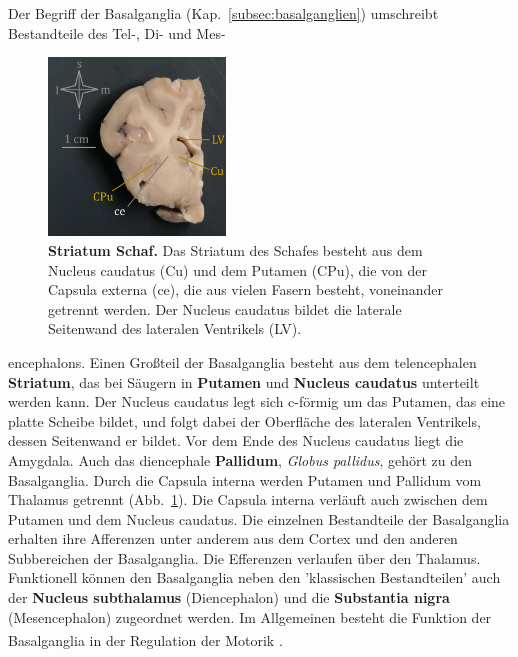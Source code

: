 Der Begriff der Basalganglia (Kap.~\ref{subsec:basalganglien}) umschreibt Bestandteile des Tel-, Di- und Mes-

\begin{figure}
    \centering
    \includegraphics[width=0.42\textwidth]{pictures/Bilder_Jule/Schaf/Ausschnitte/Striatum.png}
    \caption[Striatum Schaf]{\textbf{Striatum Schaf.} Das Striatum des Schafes besteht aus dem Nucleus caudatus (Cu) und dem Putamen (CPu), die von der Capsula externa (ce), die aus vielen Fasern besteht, voneinander getrennt werden. Der Nucleus caudatus bildet die laterale Seitenwand des lateralen Ventrikels (LV).}
    \label{fig:striatum}
\end{figure}

\noindent encephalons. Einen Großteil der Basalganglia besteht aus dem telencephalen \textbf{Striatum}, das bei Säugern in \textbf{Putamen} und \textbf{Nucleus caudatus}  unterteilt werden kann. Der Nucleus caudatus legt sich c-förmig um das Putamen, das eine platte Scheibe bildet, und folgt dabei der Oberfläche des lateralen Ventrikels, dessen Seitenwand er bildet. Vor dem Ende des Nucleus caudatus liegt die Amygdala. Auch das diencephale \textbf{Pallidum}, \textit{Globus pallidus}, gehört zu den Basalganglia. Durch die Capsula interna werden Putamen und Pallidum vom Thalamus getrennt (Abb.~\ref{fig:striatum}). Die Capsula interna verläuft auch zwischen dem Putamen und dem Nucleus caudatus. Die einzelnen Bestandteile der Basalganglia erhalten ihre Afferenzen unter anderem aus dem Cortex und den anderen Subbereichen der Basalganglia. Die Efferenzen verlaufen über den Thalamus. Funktionell können den Basalganglia neben den 'klassischen Bestandteilen' auch der \textbf{Nucleus subthalamus} (Diencephalon) und die \textbf{Substantia nigra} (Mesencephalon) zugeordnet werden.
Im Allgemeinen besteht die Funktion der Basalganglia in der Regulation der Motorik \textsuperscript{\cite[Kap.~9]{trepel2011neuroanatomie}}.


